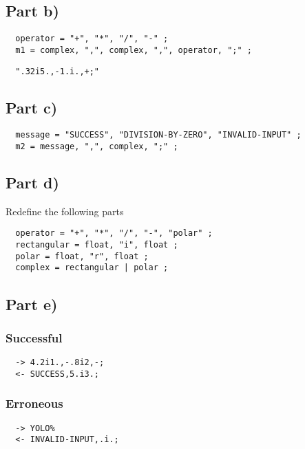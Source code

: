 \documentclass[10pt,a4paper]{article}
\begin{document}
\subsection*{Part b)}

\begin{verbatim}
  operator = "+", "*", "/", "-" ;
  m1 = complex, ",", complex, ",", operator, ";" ;
\end{verbatim}

\begin{verbatim}
  ".32i5.,-1.i.,+;"
\end{verbatim}

\subsection*{Part c)}

\begin{verbatim}
  message = "SUCCESS", "DIVISION-BY-ZERO", "INVALID-INPUT" ;
  m2 = message, ",", complex, ";" ;
\end{verbatim}

\subsection*{Part d)}

Redefine the following parts
\begin{verbatim}
  operator = "+", "*", "/", "-", "polar" ;
  rectangular = float, "i", float ;
  polar = float, "r", float ;
  complex = rectangular | polar ;
\end{verbatim}

\subsection*{Part e)}

\subsubsection*{Successful}

\begin{verbatim}
  -> 4.2i1.,-.8i2,-;
  <- SUCCESS,5.i3.;
\end{verbatim}

\subsubsection*{Erroneous}

\begin{verbatim}
  -> YOLO%
  <- INVALID-INPUT,.i.;
\end{verbatim}
\end{document}
